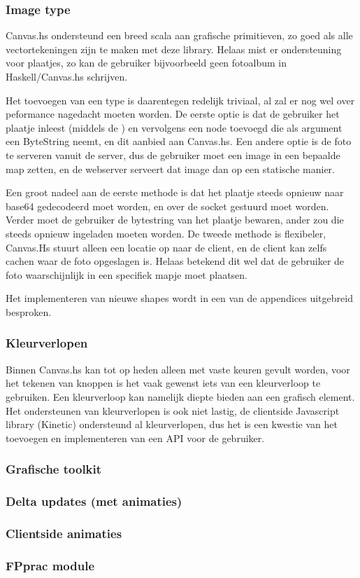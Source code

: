 \subsubsection{Image type}
Canvas.hs ondersteund een breed scala aan grafische primitieven, zo goed als alle vectortekeningen zijn te maken met deze library. Helaas mist er ondersteuning voor plaatjes, zo kan de gebruiker bijvoorbeeld geen fotoalbum in Haskell/Canvas.hs schrijven.

Het toevoegen van een  type is daarentegen redelijk triviaal, al zal er nog wel over peformance nagedacht moeten worden. De eerste optie is dat de gebruiker het plaatje inleest (middels de ) en vervolgens een  node toevoegd die als argument een ByteString neemt, en dit aanbied aan Canvas.hs. Een andere optie is de foto te serveren vanuit de server, dus de gebruiker moet een image in een bepaalde map zetten, en de webserver serveert dat image dan op een statische manier.

Een groot nadeel aan de eerste methode is dat het plaatje steeds opnieuw naar base64 gedecodeerd moet worden, en over de socket gestuurd moet worden. Verder moet de gebruiker de bytestring van het plaatje bewaren, ander zou die steeds opnieuw ingeladen moeten worden. De tweede methode is flexibeler, Canvas.Hs stuurt alleen een locatie op naar de client, en de client kan zelfs cachen waar de foto opgeslagen is. Helaas betekend dit wel dat de gebruiker de foto waarschijnlijk in een specifiek mapje moet plaatsen.

Het implementeren van nieuwe shapes wordt in een van de appendices uitgebreid besproken.

\subsubsection{Kleurverlopen}
Binnen Canvas.hs kan tot op heden alleen met vaste keuren gevult worden, voor het tekenen van knoppen is het vaak gewenst iets van een kleurverloop te gebruiken. Een kleurverloop kan namelijk diepte bieden aan een grafisch element. Het ondersteunen van kleurverlopen is ook niet lastig, de clientside Javascript library (Kinetic) ondersteund al kleurverlopen, dus het is een kwestie van het toevoegen en implementeren van een API voor de gebruiker.

\subsubsection{Grafische toolkit}
\subsubsection{Delta updates (met animaties)}
\subsubsection{Clientside animaties}
\subsubsection{FPprac module}
